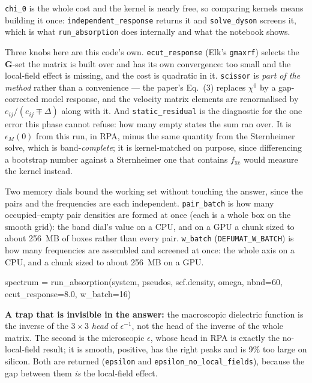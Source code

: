 \documentclass[11pt,a4paper]{article}
\newcommand{\code}[1]{\texttt{\small #1}}
\begin{document}
\code{chi\_0} is the whole cost and the kernel is nearly free, so comparing
kernels means building it once: \code{independent\_response} returns it and
\code{solve\_dyson} screens it, which is what \code{run\_absorption} does
internally and what the notebook shows.

Three knobs here are this code's own. \code{ecut\_response} (Elk's
\code{gmaxrf}) selects the $\mathbf G$-set the matrix is built over and has its
own convergence: too small and the local-field effect is missing, and the cost
is quadratic in it. \code{scissor} is \emph{part of the method} rather than a
convenience --- the paper's Eq.~(3) replaces $\chi^0$ by a gap-corrected model
response, and the velocity matrix elements are renormalised by
$e_{ij}/(e_{ij}\mp\Delta)$ along with it. And \code{static\_residual} is the
diagnostic for the one error this phase cannot refuse: how many empty states
the sum ran over. It is $\epsilon_M(0)$ from this run, in RPA, minus the same
quantity from the Sternheimer solve, which is band-\emph{complete}; it is
kernel-matched on purpose, since differencing a bootstrap number against a
Sternheimer one that contains $f_{\mathrm{xc}}$ would measure the kernel
instead.

Two memory dials bound the working set without touching the answer, since the
pairs and the frequencies are each independent. \code{pair\_batch} is how many
occupied--empty pair densities are formed at once (each is a whole box on the
smooth grid): the band dial's value on a CPU, and on a GPU a chunk sized to about
256~MB of boxes rather than every pair. \code{w\_batch}
(\code{DEFUMAT\_W\_BATCH}) is how many frequencies are assembled and screened at
once: the whole axis on a CPU, and a chunk sized to about 256~MB on a GPU.

\begin{pycode}
spectrum = run_absorption(system, pseudos, scf.density, omega,
                          nbnd=60, ecut_response=8.0, w_batch=16)
\end{pycode}

\textbf{A trap that is invisible in the answer:} the macroscopic dielectric
function is the inverse of the $3\times3$ \emph{head} of $\epsilon^{-1}$, not
the head of the inverse of the whole matrix. The second is the microscopic
$\epsilon$, whose head in RPA is exactly the no-local-field result; it is
smooth, positive, has the right peaks and is 9\% too large on silicon. Both are
returned (\code{epsilon} and \code{epsilon\_no\_local\_fields}), because the gap
between them \emph{is} the local-field effect.
\end{document}

